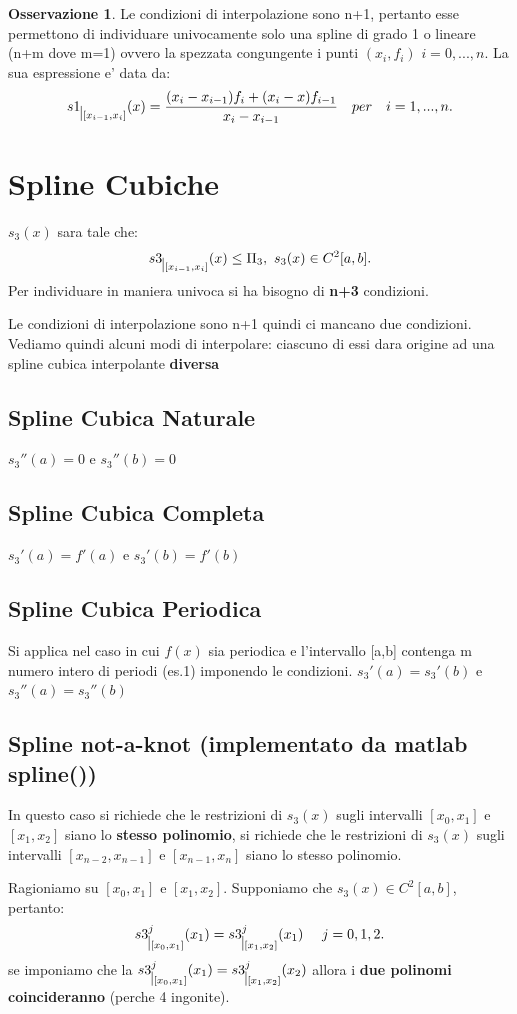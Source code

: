 \documentclass[11pt]{article}
\theoremstyle{definition}
\newtheorem{oss}{Osservazione}
\theoremstyle{plain}
\begin{document}
\begin{oss}
	Le condizioni di interpolazione sono n+1, pertanto esse permettono di individuare univocamente solo una spline di grado 1 o lineare (n+m dove m=1) ovvero la spezzata congungente i punti $(x_{i},f_i)$ $i=0,...,n$. La sua espressione e' data da:
	\[
		s1_{\mkern 1mu \vrule height 2ex\mkern2mu [x_{i-1},x_i]}(x)=\frac{(x_{i}-x_{i-1})f_i+(x_{i}-x)f_{i-1}}{x_{i}-x_{i-1}}\ \ \ per\ \ \ i=1,...,n
	.\] 

\section{Spline Cubiche}
	$s_3(x)$ sara tale che: \[
		s3_{\mkern 1mu \vrule height 2ex\mkern2mu [x_{i-1},x_i]}(x)\le \Pi_3,\ s_3(x)\in C^{2}[a,b]
	.\] 
Per individuare in maniera univoca si ha bisogno di \textbf{n+3} condizioni.

Le condizioni di interpolazione sono n+1 quindi ci mancano due condizioni. Vediamo quindi alcuni modi di interpolare: ciascuno di essi dara origine ad una spline cubica interpolante \textbf{diversa}
	\subsection{Spline Cubica Naturale}
	$s_3''(a)=0$ e $s_3''(b)=0$
	\subsection{Spline Cubica Completa}
	$s_3'(a)=f'(a)$ e $s_3'(b)=f'(b)$
	\subsection{Spline Cubica Periodica}
	Si applica nel caso in cui $f(x)$ sia periodica e l'intervallo [a,b] contenga m numero intero di periodi (es.1) imponendo le condizioni.
	$s_3'(a)=s_3'(b)$ e $s_3''(a)=s_3''(b)$
	\subsection{Spline not-a-knot (implementato da matlab spline())}
	In questo caso si richiede che le restrizioni di $s_3(x)$ sugli intervalli $[x_0,x_1]$ e $[x_1,x_2]$ siano lo \textbf{stesso polinomio}, si richiede che le restrizioni di $s_3(x)$ sugli intervalli $[x_{n-2},x_{n-1}]$ e $[x_{n-1},x_n]$ siano lo stesso polinomio.

	Ragioniamo su $[x_0,x_1]$ e $[x_1,x_2]$. Supponiamo che $s_3(x)\in C^{2}[a,b]$, pertanto: 
	\[
		s3^{j}_{\mkern 1mu \vrule height 2ex\mkern2mu [x_{0},x_1]}(x_1)=s3^{j}_{\mkern 1mu \vrule height 2ex\mkern2mu [x_{1},x_2]}(x_1)\ \ \ \ j=0,1,2
	.\] 
se imponiamo che la $s3^{j}_{\mkern 1mu \vrule height 2ex\mkern2mu [x_{0},x_1]}(x_1)=s3^{j}_{\mkern 1mu \vrule height 2ex\mkern2mu [x_{1},x_2]}(x_2)$ allora i \textbf{due polinomi coincideranno} (perche 4 ingonite).


\end{oss}
\end{document}
